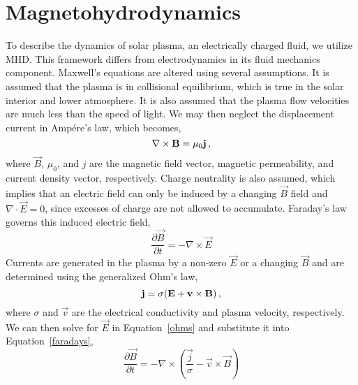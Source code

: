 \section{Magnetohydrodynamics}\label{sect:mhd}

To describe the dynamics of solar plasma, an electrically charged fluid, we utilize \gls{MHD}. This framework differs from electrodynamics in its fluid mechanics component. Maxwell's equations are altered using several assumptions. It is assumed that the plasma is in collisional equilibrium, which is true in the solar interior and lower atmosphere. It is also assumed that the plasma flow velocities are much less than the speed of light. 
We may then neglect the displacement current in Amp\'ere's law, which becomes,
\begin{equation}\label{amperes}
\nabla \times \vec{B} = \mu_0 \vec{j} \mbox{\,,}
\end{equation}
where $\vec{B}$, $\mu_0$, and $j$ are the magnetic field vector, magnetic permeability, and current density vector, respectively. Charge neutrality is also assumed, which implies that an electric field can only be induced by a changing $\vec{B}$ field and $\nabla\cdot \vec{E}=0$, since excesses of charge are not allowed to accumulate. Faraday's law governs this induced electric field,
\begin{equation}\label{faradays}
\frac{\partial \vec{B}}{\partial t} = - \nabla \times \vec{E}  
\end{equation}
Currents are generated in the plasma by a non-zero $\vec{E}$ or a changing $\vec{B}$ and are determined using the generalized Ohm's law,
\begin{equation}  \label{ohms}
\vec{j} = \sigma(\vec{E} + \vec{v} \times \vec{B}) \mbox{\,,}
\end{equation}
where $\sigma$ and $\vec{v}$ are the electrical conductivity and plasma velocity, respectively. 
We can then solve for $\vec{E}$ in Equation~\ref{ohms} and substitute it into Equation~\ref{faradays},
\begin{equation}
\frac{\partial \vec{B}}{\partial t} = -\nabla \times \left( \frac{\vec{j}}{\sigma} - \vec{v}\times\vec{B} \right)  
\end{equation}
